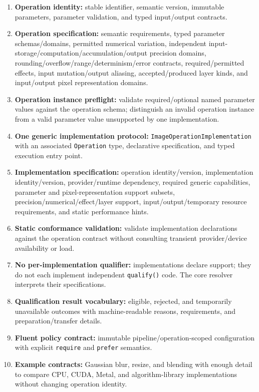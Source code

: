 \deliverables
\begin{enumerate}
  \item \textbf{Operation identity:} stable identifier, semantic version, immutable parameters, parameter validation, and typed input/output contracts.
  \item \textbf{Operation specification:} semantic requirements, typed parameter schemas/domains, permitted numerical variation, independent input-storage/computation/accumulation/output precision domains, rounding/overflow/range/determinism/error contracts, required/permitted effects, input mutation/output aliasing, accepted/produced layer kinds, and input/output pixel representation domains.
  \item \textbf{Operation instance preflight:} validate required/optional named parameter values against the operation schema; distinguish an invalid operation instance from a valid parameter value unsupported by one implementation.
  \item \textbf{One generic implementation protocol:} \texttt{ImageOperationImplementation} with an associated \texttt{Operation} type, declarative specification, and typed execution entry point.
  \item \textbf{Implementation specification:} operation identity/version, implementation identity/version, provider/runtime dependency, required generic capabilities, parameter and pixel-representation support subsets, precision/numerical/effect/layer support, input/output/temporary resource requirements, and static performance hints.
  \item \textbf{Static conformance validation:} validate implementation declarations against the operation contract without consulting transient provider/device availability or load.
  \item \textbf{No per-implementation qualifier:} implementations declare support; they do not each implement independent \texttt{qualify()} code. The core resolver interprets their specifications.
  \item \textbf{Qualification result vocabulary:} eligible, rejected, and temporarily unavailable outcomes with machine-readable reasons, requirements, and preparation/transfer details.
  \item \textbf{Fluent policy contract:} immutable pipeline/operation-scoped configuration with explicit \texttt{require} and \texttt{prefer} semantics.
  \item \textbf{Example contracts:} Gaussian blur, resize, and blending with enough detail to compare CPU, CUDA, Metal, and algorithm-library implementations without changing operation identity.
\end{enumerate}

